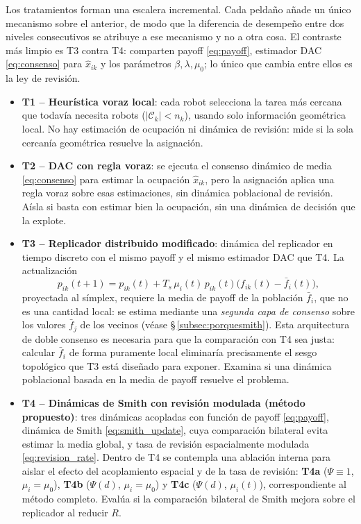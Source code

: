 Los tratamientos forman una escalera incremental. Cada peldaño añade un único mecanismo
sobre el anterior, de modo que la diferencia de desempeño entre dos niveles consecutivos
se atribuye a ese mecanismo y no a otra cosa. El contraste más limpio es T3 contra T4:
comparten payoff \eqref{eq:payoff}, estimador DAC \eqref{eq:consenso} para $\hat{x}_{ik}$
y los parámetros $\beta,\lambda,\mu_0$; lo único que cambia entre ellos es la ley de
revisión.

\begin{itemize}
  \item \textbf{T1 -- Heurística voraz local}: cada robot selecciona la tarea más
    cercana que todavía necesita robots ($|\mathcal{C}_k| < n_k$), usando solo
    información geométrica local. No hay estimación de ocupación ni dinámica de
    revisión: mide si la sola cercanía geométrica resuelve la asignación.

  \item \textbf{T2 -- DAC con regla voraz}: se ejecuta el consenso dinámico de
    media \eqref{eq:consenso} para estimar la ocupación $\hat{x}_{ik}$, pero la
    asignación aplica una regla voraz sobre esas estimaciones, sin dinámica
    poblacional de revisión. Aísla si basta con estimar bien la ocupación, sin una
    dinámica de decisión que la explote.

  \item \textbf{T3 -- Replicador distribuido modificado}: dinámica del replicador
    en tiempo discreto \citep{quijano2017population} con el mismo payoff y el
    mismo estimador DAC que T4. La actualización
    \[
      p_{ik}(t{+}1) = p_{ik}(t) + T_s\,\mu_i(t)\,p_{ik}(t)\bigl(f_{ik}(t) - \bar{f}_i(t)\bigr),
    \]
    proyectada al símplex, requiere la media de payoff de la población
    $\bar{f}_i$, que no es una cantidad local: se estima mediante una
    \emph{segunda capa de consenso} sobre los valores $\bar{f}_j$ de los vecinos
    (véase \S\,\ref{subsec:porquesmith}). Esta arquitectura de doble consenso es
    necesaria para que la comparación con T4 sea justa: calcular $\bar{f}_i$ de
    forma puramente local eliminaría precisamente el sesgo topológico que T3 está
    diseñado para exponer. Examina si una dinámica poblacional basada en la media de
    payoff resuelve el problema.

  \item \textbf{T4 -- Dinámicas de Smith con revisión modulada (método propuesto)}:
    tres dinámicas acopladas con función de payoff \eqref{eq:payoff}, dinámica de
    Smith \eqref{eq:smith_update}, cuya comparación bilateral evita estimar la
    media global, y tasa de revisión espacialmente modulada
    \eqref{eq:revision_rate}. Dentro de T4 se contempla una ablación interna para
    aislar el efecto del acoplamiento espacial y de la tasa de revisión:
    \textbf{T4a} ($\Psi\equiv1$, $\mu_i=\mu_0$), \textbf{T4b} ($\Psi(d)$,
    $\mu_i=\mu_0$) y \textbf{T4c} ($\Psi(d)$, $\mu_i(t)$), correspondiente al método
    completo. Evalúa si la comparación bilateral de Smith mejora sobre el replicador
    al reducir $R$.


\end{itemize}
